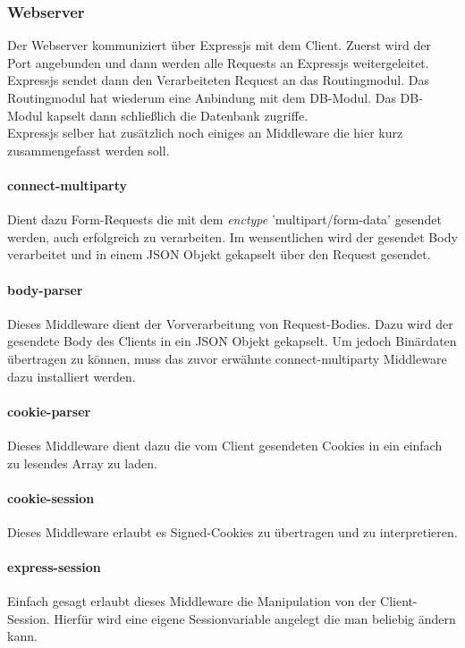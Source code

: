 \documentclass[a4paper,bibtotoc,oneside]{scrartcl}	%
\begin{document}
		\subsubsection{Webserver}
			Der Webserver kommuniziert über Expressjs mit dem Client. Zuerst wird der Port angebunden und dann werden alle Requests an Expressjs weitergeleitet. Expressjs sendet dann den Verarbeiteten Request an das Routingmodul. Das Routingmodul hat wiederum eine Anbindung mit dem DB-Modul. Das DB-Modul kapselt dann schließlich die Datenbank zugriffe.\\
			
			\noindent Expressjs selber hat zusätzlich noch einiges an Middleware die hier kurz zusammengefasst werden soll.
			
			\paragraph{connect-multiparty}
			Dient dazu Form-Requests die mit dem \textit{enctype} 'multipart/form-data' gesendet werden, auch erfolgreich zu verarbeiten. Im wensentlichen wird der gesendet Body verarbeitet und in einem JSON Objekt gekapselt über den Request gesendet.
			
			\paragraph{body-parser}
			Dieses Middleware dient der Vorverarbeitung von Request-Bodies. Dazu wird der gesendete Body des Clients in ein JSON Objekt gekapselt. Um jedoch Binärdaten übertragen zu können, muss das zuvor erwähnte connect-multiparty Middleware dazu installiert werden.
			
			\paragraph{cookie-parser}
			Dieses Middleware dient dazu die vom Client gesendeten Cookies in ein einfach zu lesendes Array zu laden.
			
			\paragraph{cookie-session}
			Dieses Middleware erlaubt es Signed-Cookies zu übertragen und zu interpretieren.
			
			\paragraph{express-session}
			Einfach gesagt erlaubt dieses Middleware die Manipulation von der Client-Session. Hierfür wird eine eigene Sessionvariable angelegt die man beliebig ändern kann.
			
\end{document}
